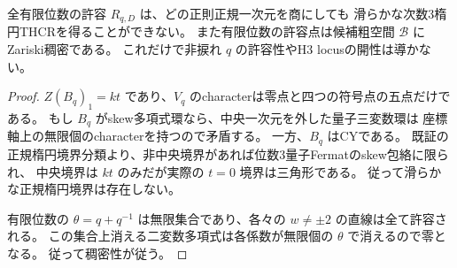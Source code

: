 \begin{corollary}[滑らかな正規楕円境界を持たない有限位数全族]
全有限位数の許容 $R_{q,D}$ は、どの正則正規一次元を商にしても
滑らかな次数3楕円THCRを得ることができない。
また有限位数の許容点は候補粗空間 $\mathcal B$ にZariski稠密である。
これだけで非捩れ $q$ の許容性やH3 locusの開性は導かない。
\end{corollary}
\begin{proof}
$Z(B_q)_1=kt$ であり、$V_q$ のcharacterは零点と四つの符号点の五点だけである。
もし $B_q$ がskew多項式環なら、中央一次元を外した量子三変数環は
座標軸上の無限個のcharacterを持つので矛盾する。
一方、$B_q$ はCYである。
既証の正規楕円境界分類より、非中央境界があれば位数3量子Fermatのskew包絡に限られ、
中央境界は $kt$ のみだが実際の $t=0$ 境界は三角形である。
従って滑らかな正規楕円境界は存在しない。

有限位数の $\theta=q+q^{-1}$ は無限集合であり、各々の $w\ne\pm2$ の直線は全て許容される。
この集合上消える二変数多項式は各係数が無限個の $\theta$ で消えるので零となる。
従って稠密性が従う。
\end{proof}
